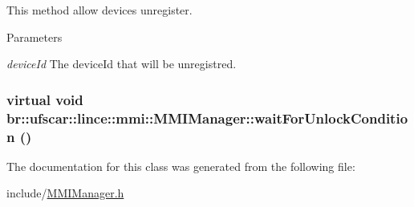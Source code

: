 This method allow devices unregister. 


\begin{DoxyParams}{Parameters}
\item[{\em deviceId}]The deviceId that will be unregistred. \end{DoxyParams}
\hypertarget{classbr_1_1ufscar_1_1lince_1_1mmi_1_1MMIManager_a1b1bf42389517969c28bfc0062e05f91}{
\subsubsection[{waitForUnlockCondition}]{\setlength{\rightskip}{0pt plus 5cm}virtual void br::ufscar::lince::mmi::MMIManager::waitForUnlockCondition ()}}
\label{classbr_1_1ufscar_1_1lince_1_1mmi_1_1MMIManager_a1b1bf42389517969c28bfc0062e05f91}


The documentation for this class was generated from the following file:\begin{DoxyCompactItemize}
\item 
include/\hyperlink{MMIManager_8h}{MMIManager.h}\end{DoxyCompactItemize}
